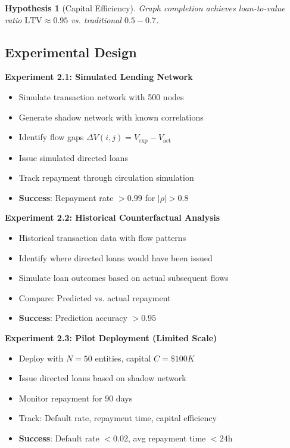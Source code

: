 \documentclass[12pt]{article}
\newtheorem{hypothesis}{Hypothesis}
\begin{document}
\begin{hypothesis}[Capital Efficiency]
Graph completion achieves loan-to-value ratio $\text{LTV} \approx 0.95$ vs. traditional $0.5-0.7$.
\end{hypothesis}

\subsection{Experimental Design}

\textbf{Experiment 2.1: Simulated Lending Network}
\begin{itemize}
    \item Simulate transaction network with 500 nodes
    \item Generate shadow network with known correlations
    \item Identify flow gaps $\Delta V(i,j) = V_{\text{exp}} - V_{\text{act}}$
    \item Issue simulated directed loans
    \item Track repayment through circulation simulation
    \item \textbf{Success}: Repayment rate $> 0.99$ for $|\rho| > 0.8$
\end{itemize}

\textbf{Experiment 2.2: Historical Counterfactual Analysis}
\begin{itemize}
    \item Historical transaction data with flow patterns
    \item Identify where directed loans would have been issued
    \item Simulate loan outcomes based on actual subsequent flows
    \item Compare: Predicted vs. actual repayment
    \item \textbf{Success}: Prediction accuracy $> 0.95$
\end{itemize}

\textbf{Experiment 2.3: Pilot Deployment (Limited Scale)}
\begin{itemize}
    \item Deploy with $N=50$ entities, capital $C=\$100K$
    \item Issue directed loans based on shadow network
    \item Monitor repayment for 90 days
    \item Track: Default rate, repayment time, capital efficiency
    \item \textbf{Success}: Default rate $< 0.02$, avg repayment time $< 24$h
\end{itemize}
\end{document}
